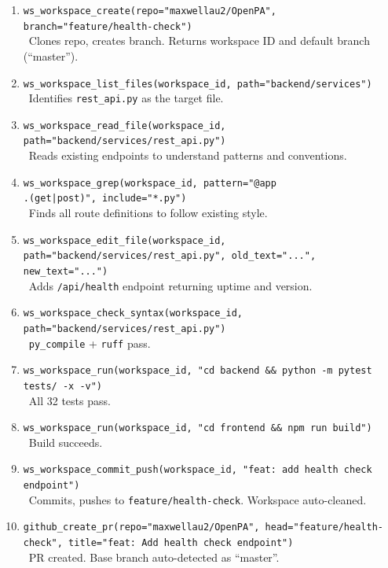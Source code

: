 \begin{enumerate}[leftmargin=*]
  \item \texttt{ws\_workspace\_create(repo="maxwellau2/OpenPA", branch="feature/health-check")}\\
    \textrightarrow\ Clones repo, creates branch. Returns workspace ID and default branch (``master'').

  \item \texttt{ws\_workspace\_list\_files(workspace\_id, path="backend/services")}\\
    \textrightarrow\ Identifies \texttt{rest\_api.py} as the target file.

  \item \texttt{ws\_workspace\_read\_file(workspace\_id, path="backend/services/rest\_api.py")}\\
    \textrightarrow\ Reads existing endpoints to understand patterns and conventions.

  \item \texttt{ws\_workspace\_grep(workspace\_id, pattern="@app\\.(get|post)", include="*.py")}\\
    \textrightarrow\ Finds all route definitions to follow existing style.

  \item \texttt{ws\_workspace\_edit\_file(workspace\_id, path="backend/services/rest\_api.py", old\_text="...", new\_text="...")}\\
    \textrightarrow\ Adds \texttt{/api/health} endpoint returning uptime and version.

  \item \texttt{ws\_workspace\_check\_syntax(workspace\_id, path="backend/services/rest\_api.py")}\\
    \textrightarrow\ \texttt{py\_compile} + \texttt{ruff} pass.

  \item \texttt{ws\_workspace\_run(workspace\_id, "cd backend \&\& python -m pytest tests/ -x -v")}\\
    \textrightarrow\ All 32 tests pass.

  \item \texttt{ws\_workspace\_run(workspace\_id, "cd frontend \&\& npm run build")}\\
    \textrightarrow\ Build succeeds.

  \item \texttt{ws\_workspace\_commit\_push(workspace\_id, "feat: add health check endpoint")}\\
    \textrightarrow\ Commits, pushes to \texttt{feature/health-check}. Workspace auto-cleaned.

  \item \texttt{github\_create\_pr(repo="maxwellau2/OpenPA", head="feature/health-check", title="feat: Add health check endpoint")}\\
    \textrightarrow\ PR created. Base branch auto-detected as ``master''.
\end{enumerate}

